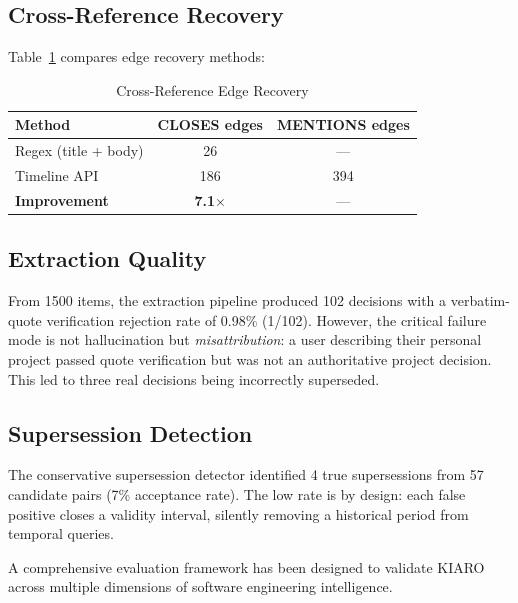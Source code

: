 \documentclass[conference]{IEEEtran}
\begin{document}
\subsection{Cross-Reference Recovery}
Table~\ref{tab:xref} compares edge recovery methods:

\begin{table}[h]
\caption{Cross-Reference Edge Recovery}
\label{tab:xref}
\centering
\begin{tabular}{@{}lcc@{}}
\toprule
Method & CLOSES edges & MENTIONS edges \\
\midrule
Regex (title + body) & 26 & --- \\
Timeline API & 186 & 394 \\
\textbf{Improvement} & \textbf{7.1$\times$} & --- \\
\bottomrule
\end{tabular}
\end{table}

\subsection{Extraction Quality}
From 1500 items, the extraction pipeline produced 102 decisions with a verbatim-quote verification rejection rate of 0.98\% (1/102). However, the critical failure mode is not hallucination but \emph{misattribution}: a user describing their personal project passed quote verification but was not an authoritative project decision. This led to three real decisions being incorrectly superseded.

\subsection{Supersession Detection}
The conservative supersession detector identified 4 true supersessions from 57 candidate pairs (7\% acceptance rate). The low rate is by design: each false positive closes a validity interval, silently removing a historical period from temporal queries.

A comprehensive evaluation framework has been designed to validate KIARO across multiple dimensions of software engineering intelligence.
\end{document}
